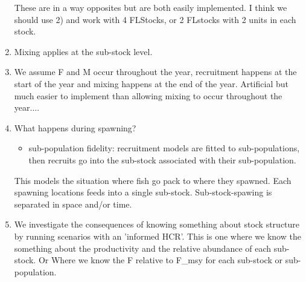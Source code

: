 \documentclass[a4paper,english]{article}
\begin{document}
\begin{enumerate}
\begin{enumerate}
    \end{enumerate}
  These are in a way opposites but are both easily implemented.  I think we should use 2) and work with 4 FLStocks, or 2 FLstocks with 2 units in each stock.
  \item Mixing applies at the sub-stock level.
  \item We assume F and M occur throughout the year, recruitment happens at the start of the year and mixing happens at the end of the year.  Artificial but much easier to implement than allowing mixing to occur throughout the year....
  \item What happens during spawning?
    \begin{itemize}
      \item sub-population fidelity: recruitment models are fitted to sub-populations, then recruits go into the sub-stock associated with their sub-population.
    \end{itemize}
    This models the situation where fish go pack to where they spawned.  Each spawning locations feeds into a single sub-stock.  Sub-stock-spawing is separated in space and/or time.
  \item We investigate the consequences of knowing something about stock structure by running scenarios with an 'informed HCR'.  This is one where we know the something about the productivity and the relative abundance of each sub-stock.  Or Where we know the F relative to F_{msy} for each sub-stock or sub-population.
\end{enumerate}









\end{document}
